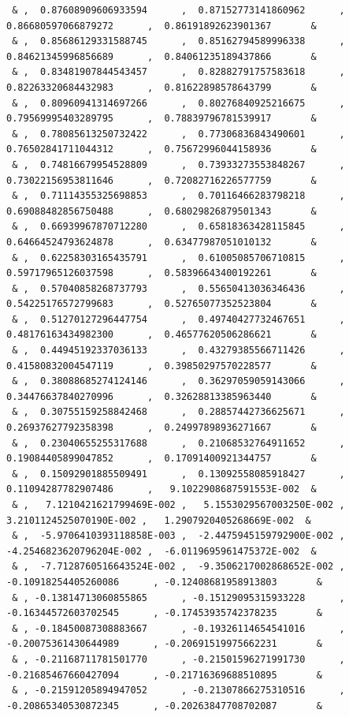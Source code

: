 \documentclass[a4paper,10pt]{report}
\begin{document}
{\begin{verbatim}
 & ,  0.87608909606933594      ,  0.87152773141860962      ,  0.86680597066879272      ,  0.86191892623901367       &
 & ,  0.85686129331588745      ,  0.85162794589996338      ,  0.84621345996856689      ,  0.84061235189437866       &
 & ,  0.83481907844543457      ,  0.82882791757583618      ,  0.82263320684432983      ,  0.81622898578643799       &
 & ,  0.80960941314697266      ,  0.80276840925216675      ,  0.79569995403289795      ,  0.78839796781539917       &
 & ,  0.78085613250732422      ,  0.77306836843490601      ,  0.76502841711044312      ,  0.75672996044158936       &
 & ,  0.74816679954528809      ,  0.73933273553848267      ,  0.73022156953811646      ,  0.72082716226577759       &
 & ,  0.71114355325698853      ,  0.70116466283798218      ,  0.69088482856750488      ,  0.68029826879501343       &
 & ,  0.66939967870712280      ,  0.65818363428115845      ,  0.64664524793624878      ,  0.63477987051010132       &
 & ,  0.62258303165435791      ,  0.61005085706710815      ,  0.59717965126037598      ,  0.58396643400192261       &
 & ,  0.57040858268737793      ,  0.55650413036346436      ,  0.54225176572799683      ,  0.52765077352523804       &
 & ,  0.51270127296447754      ,  0.49740427732467651      ,  0.48176163434982300      ,  0.46577620506286621       &
 & ,  0.44945192337036133      ,  0.43279385566711426      ,  0.41580832004547119      ,  0.39850297570228577       &
 & ,  0.38088685274124146      ,  0.36297059059143066      ,  0.34476637840270996      ,  0.32628813385963440       &
 & ,  0.30755159258842468      ,  0.28857442736625671      ,  0.26937627792358398      ,  0.24997898936271667       &
 & ,  0.23040655255317688      ,  0.21068532764911652      ,  0.19084405899047852      ,  0.17091400921344757       &
 & ,  0.15092901885509491      ,  0.13092558085918427      ,  0.11094287782907486      ,   9.1022908687591553E-002  &
 & ,   7.1210421621799469E-002 ,   5.1553029567003250E-002 ,   3.2101124525070190E-002 ,   1.2907920405268669E-002  &
 & ,  -5.9706410393118858E-003 ,  -2.4475945159792900E-002 ,  -4.2546823620796204E-002 ,  -6.0119695961475372E-002  &
 & ,  -7.7128760516643524E-002 ,  -9.3506217002868652E-002 , -0.10918254405260086      , -0.12408681958913803       &
 & , -0.13814713060855865      , -0.15129095315933228      , -0.16344572603702545      , -0.17453935742378235       &
 & , -0.18450087308883667      , -0.19326114654541016      , -0.20075361430644989      , -0.20691519975662231       &
 & , -0.21168711781501770      , -0.21501596271991730      , -0.21685467660427094      , -0.21716369688510895       &
 & , -0.21591205894947052      , -0.21307866275310516      , -0.20865340530872345      , -0.20263847708702087       &

\end{verbatim}}
\end{document}
